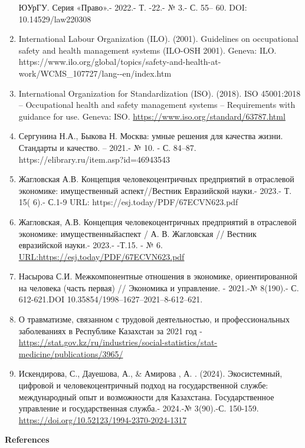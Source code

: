 \begin{enumerate}
  ЮУрГУ. Серия «Право».- 2022.- Т. -22.- № 3.- С. 55-- 60. DOI:
  10.14529/law220308
\item
  International Labour Organization (ILO). (2001). Guidelines on
  occupational safety and health management systems (ILO-OSH 2001).
  Geneva: ILO.
  https://www.ilo.org/global/topics/safety-and-health-at-work/WCMS\_107727/lang-\/-en/index.htm
\item
  International Organization for Standardization (ISO). (2018). ISO
  45001:2018 -- Occupational health and safety management systems --
  Requirements with guidance for use. Geneva: ISO.
  \url{https://www.iso.org/standard/63787.html}
\item
  Сергунина Н.А., Быкова Н. Москва: умные решения для качества жизни.
  Стандарты и качество. -- 2021.- № 10. - С. 84--87.
  https://elibrary.ru/item.asp?id=46943543
\item
  Жагловская А.В. Концепция человекоцентричных предприятий в отраслевой
  экономике: имущественный аспект//Вестник Евразийской науки.- 2023.- Т.
  15( 6).- С.1-9 URL: https://esj.today/PDF/67ECVN623.pdf
\item
  Жагловская, А.В. Концепция человекоцентричных предприятий в отраслевой
  экономике: имущественныйаспект / А. В. Жагловская // Вестник
  евразийской науки.- 2023.- -Т.15. - № 6.
  \url{URL:https://esj.today/PDF/67ECVN623.pdf}
\item
  Насырова С.И. Межкомпонентные отношения в экономике, ориентированной
  на человека (часть первая) // Экономика и управление. - 2021.-№
  8(190).- С. 612-621.DOI 10.35854/1998--1627--2021--8-612--621.
\item
  О травматизме, связанном с трудовой деятельностью, и профессиональных
  заболеваниях в Республике Казахстан за 2021 год -
  \url{https://stat.gov.kz/ru/industries/social-statistics/stat-medicine/publications/3965/}
\item
  Искендирова, С., Дауешова, А., \& Амирова , А. . (2024). Экосистемный,
  цифровой и человекоцентричный подход на государственной службе:
  международный опыт и возможности для Казахстана. Государственное
  управление и государственная служба.- 2024.-№ 3(90).-С. 150-159.
  \url{https://doi.org/10.52123/1994-2370-2024-1317}
\end{enumerate}

{\bfseries References}

